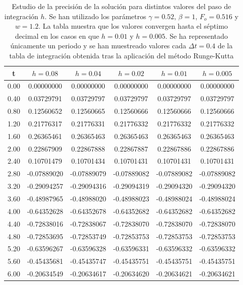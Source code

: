 \documentclass[11pt]{article}
\begin{document}
\begin{table}[h]
\centering
\begin{tabular}{|c|c|c|c|c|c|}
\hline
t & $h = 0.08$ & $h = 0.04$ & $h = 0.02$ & $h = 0.01$ & $h = 0.005$ \\
\hline
0.00 & 0.00000000 & 0.00000000 & 0.00000000 & 0.00000000 & 0.00000000 \\ 
0.40 & 0.03729791 & 0.03729797 & 0.03729797 & 0.03729797 & 0.03729797 \\ 
0.80 & 0.12560652 & 0.12560665 & 0.12560666 & 0.12560666 & 0.12560666 \\ 
1.20 & 0.21776317 & 0.21776331 & 0.21776332 & 0.21776332 & 0.21776332 \\ 
1.60 & 0.26365461 & 0.26365463 & 0.26365463 & 0.26365463 & 0.26365463 \\ 
2.00 & 0.22867909 & 0.22867888 & 0.22867887 & 0.22867886 & 0.22867886 \\ 
2.40 & 0.10701479 & 0.10701434 & 0.10701431 & 0.10701431 & 0.10701431 \\ 
2.80 & -0.07889020 & -0.07889079 & -0.07889082 & -0.07889082 & -0.07889082 \\ 
3.20 & -0.29094257 & -0.29094316 & -0.29094319 & -0.29094320 & -0.29094320 \\ 
3.60 & -0.48987965 & -0.48988020 & -0.48988023 & -0.48988024 & -0.48988024 \\ 
4.00 & -0.64352628 & -0.64352678 & -0.64352682 & -0.64352682 & -0.64352682 \\ 
4.40 & -0.72838016 & -0.72838067 & -0.72838070 & -0.72838070 & -0.72838070 \\ 
4.80 & -0.72853695 & -0.72853749 & -0.72853753 & -0.72853753 & -0.72853753 \\ 
5.20 & -0.63596267 & -0.63596328 & -0.63596331 & -0.63596332 & -0.63596332 \\ 
5.60 & -0.45435681 & -0.45435747 & -0.45435751 & -0.45435751 & -0.45435751 \\ 
6.00 & -0.20634549 & -0.20634617 & -0.20634620 & -0.20634621 & -0.20634621 \\ 
\hline
\end{tabular}
\caption{Estudio de la precisión de la solución para distintos valores del paso
de integración $h$. Se han utilizado los parámetros $\gamma=0.52$, $\beta=1$,
$F_o = 0.516$ y $w=1.2$. La tabla muestra que los valores convergen hasta el
séptimo decimal en los casos en que $h = 0.01$ y $h=0.005$. Se ha representado
únicamente un periodo y se han muestreado valores cada $\Delta{t} = 0.4$ de la
tabla de integración obtenida tras la aplicación del método Runge-Kutta}
\label{tab:precision}
\end{table}
\end{document}
